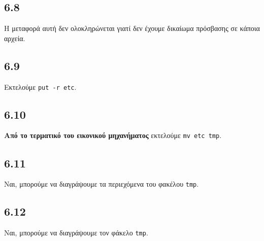 \documentclass[a4paper, 12pt]{article}
\begin{document}
	\subsection*{6.8}
		Η μεταφορά αυτή δεν ολοκληρώνεται γιατί δεν έχουμε δικαίωμα πρόσβασης σε κάποια αρχεία.

	\subsection*{6.9}
		Εκτελούμε \verb|put -r etc|.

	\subsection*{6.10}
		\textbf{Από το τερματικό του εικονικού μηχανήματος} εκτελούμε \verb|mv etc tmp|.

	\subsection*{6.11}
		Ναι, μπορούμε να διαγράψουμε τα περιεχόμενα του φακέλου \verb|tmp|.

	\subsection*{6.12}
		Nαι, μπορούμε να διαγράψουμε τον φάκελο \verb|tmp|.
\end{document}
